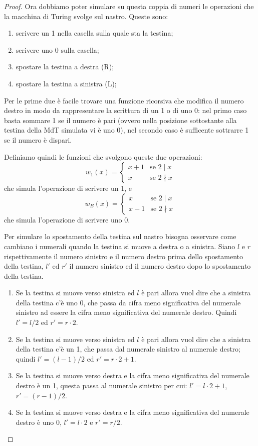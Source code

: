 \begin{proof}
Ora dobbiamo poter simulare su questa coppia di numeri le operazioni che la
macchina di Turing svolge sul nastro. Queste sono:
\begin{enumerate}
 \item scrivere un 1 nella casella sulla quale sta la testina;
 \item scrivere uno 0 sulla casella;
 \item spostare la testina a destra (R);
 \item spostare la testina a sinistra (L);
\end{enumerate}

Per le prime due è facile trovare una funzione ricorsiva che modifica il
numero destro in modo da rappresentare la scrittura di un 1 o di uno 0: nel
primo caso basta sommare 1 se il numero è pari (ovvero nella posizione
sottostante alla testina della MdT simulata vi è uno 0), nel secondo caso è
sufficente sottrarre 1 se il numero è dispari.

Definiamo quindi le funzioni che svolgono queste due operazioni:
$$w_1(x) = \left\{
\begin{array}{ll}
x+1 & \text{se } 2 \mid x\\
x & \text{se } 2 \nmid x
\end{array}
\right.$$
che simula l'operazione di scrivere un 1, e
$$w_B(x) = \left\{
\begin{array}{ll}
x & \text{se } 2 \mid x\\
x-1 & \text{se } 2 \nmid x
\end{array}
\right.$$
che simula l'operazione di scrivere uno 0.

Per simulare lo spostamento della testina sul nastro bisogna osservare come
cambiano i numerali quando la testina si muove a destra o a sinistra. Siano $l$
e $r$ rispettivamente il numero sinistro e il numero destro prima dello
spostamento della testina, $l'$ ed $r'$ il numero sinistro ed il numero destro
dopo lo spostamento della testina.
\begin{enumerate}
 \item Se la testina si muove verso sinistra ed $l$ è pari allora vuol
   dire che a sinistra della testina c'è uno 0, che passa da cifra
   meno significativa del numerale sinistro ad essere la cifra meno
   significativa del numerale destro.  Quindi $l' = l/2$ ed $r' = r
   \cdot 2$.
 \item Se la testina si muove verso sinistra ed $l$ è pari allora vuol
   dire che a sinistra della testina c'è un 1, che passa dal numerale
   sinistro al numerale destro; quindi $l' = (l-1)/2$ ed $r' = r \cdot
   2 + 1$.
 \item Se la testina si muove verso destra e la cifra meno
   significativa del numerale destro è un 1, questa passa al numerale
   sinistro per cui: $l' = l \cdot 2 + 1$, $r' = (r-1)/2$.
 \item Se la testina si muove verso destra e la cifra meno
   significativa del numerale destro è uno 0, $l' = l \cdot 2$ e $r' =
   r/2$.
\end{enumerate}


\end{proof}
